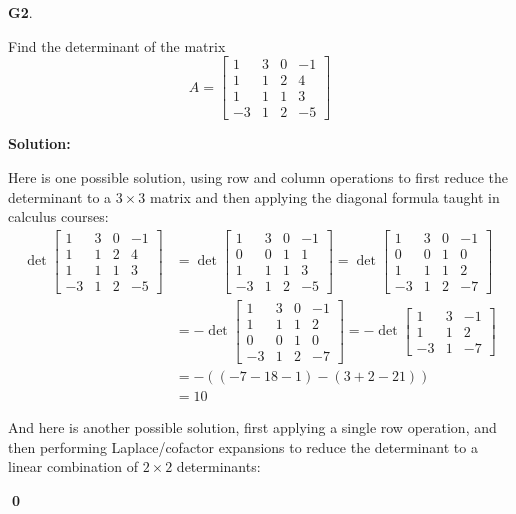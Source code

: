 \documentclass{article}
\newenvironment{problem}[1]
{
  \begin{flushleft}
  \textbf{#1}.
  \ignorespaces
}
{
  \end{flushleft}
}
\newenvironment{solution}
{
  \ignorespaces
  \textbf{Solution:}
}
{
  \ignorespacesafterend
  \begin{flushright}
  {\bfseries \qed}
  \end{flushright}
}
\begin{document}
\begin{problem}{G2}
Find the determinant of the matrix
\[
  A
    =
  \begin{bmatrix}
    1 & 3 & 0 & -1 \\
    1 & 1 & 2 & 4 \\
    1 & 1 & 1 & 3 \\
    -3 & 1 & 2 & -5
  \end{bmatrix}
\]
\end{problem}
\begin{solution}
Here is one possible solution, using row and column operations to first reduce
the determinant to a \(3\times 3\) matrix and then applying the diagonal
formula taught in calculus courses:
\begin{align*}
\det
  \begin{bmatrix}
    1 & 3 & 0 & -1 \\
    1 & 1 & 2 & 4 \\
    1 & 1 & 1 & 3 \\
    -3 & 1 & 2 & -5
  \end{bmatrix}
&=
\det \begin{bmatrix} 1 & 3 & 0 & -1 \\ 0 & 0 & 1 & 1 \\ 1 & 1 & 1 & 3 \\ -3 & 1 & 2 & -5 \end{bmatrix} =
\det \begin{bmatrix} 1 & 3 & 0 & -1 \\ 0 & 0 & 1 & 0 \\ 1 & 1 & 1 & 2 \\ -3 & 1 & 2 & -7 \end{bmatrix} \\ &=
-\det \begin{bmatrix} 1 & 3 & 0 & -1 \\ 1 & 1 & 1 & 2 \\ 0 & 0 & 1 & 0 \\ -3 & 1 & 2 & -7 \end{bmatrix} =
-\det \begin{bmatrix} 1 & 3 & -1 \\ 1 & 1 & 2 \\ -3 & 1  & -7 \end{bmatrix} \\  &=
-((-7-18-1)-(3+2-21)) \\
 &=10
 \end{align*}

 And here is another possible solution, first applying a single row operation,
 and then performing Laplace/cofactor expansions to reduce the determinant
 to a linear combination of \(2\times 2\) determinants:


\end{solution}
\end{document}
